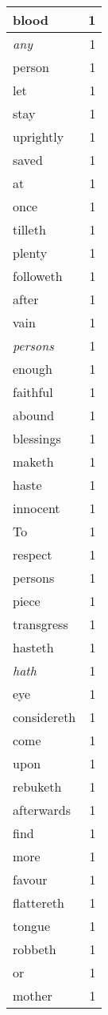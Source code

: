\begin{center}
\begin{longtable}{l|r}
blood & 1\\ \hline 
\emph{any} & 1\\ \hline 
person & 1\\ \hline 
let & 1\\ \hline 
stay & 1\\ \hline 
uprightly & 1\\ \hline 
saved & 1\\ \hline 
at & 1\\ \hline 
once & 1\\ \hline 
tilleth & 1\\ \hline 
plenty & 1\\ \hline 
followeth & 1\\ \hline 
after & 1\\ \hline 
vain & 1\\ \hline 
\emph{persons} & 1\\ \hline 
enough & 1\\ \hline 
faithful & 1\\ \hline 
abound & 1\\ \hline 
blessings & 1\\ \hline 
maketh & 1\\ \hline 
haste & 1\\ \hline 
innocent & 1\\ \hline 
To & 1\\ \hline 
respect & 1\\ \hline 
persons & 1\\ \hline 
piece & 1\\ \hline 
transgress & 1\\ \hline 
hasteth & 1\\ \hline 
\emph{hath} & 1\\ \hline 
eye & 1\\ \hline 
considereth & 1\\ \hline 
come & 1\\ \hline 
upon & 1\\ \hline 
rebuketh & 1\\ \hline 
afterwards & 1\\ \hline 
find & 1\\ \hline 
more & 1\\ \hline 
favour & 1\\ \hline 
flattereth & 1\\ \hline 
tongue & 1\\ \hline 
robbeth & 1\\ \hline 
or & 1\\ \hline 
mother & 1\\ \hline 

\end{longtable}
\end{center}
